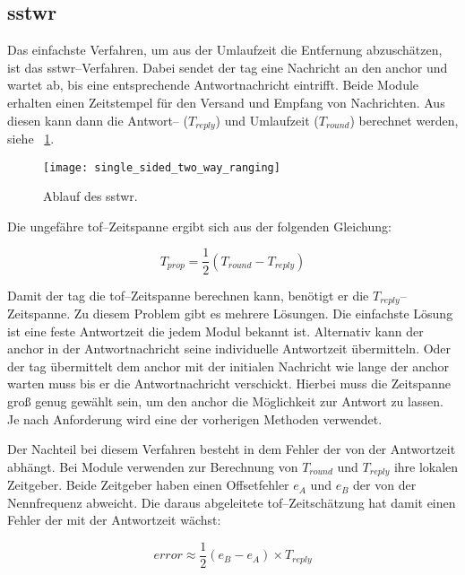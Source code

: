 \subsection{\acrlong{sstwr}}

Das einfachste Verfahren, um aus der Umlaufzeit die Entfernung abzuschätzen, ist das \Gls{sstwr}--Verfahren. Dabei sendet der \Gls{tag} eine Nachricht an den \Gls{anchor} und wartet ab, bis eine entsprechende Antwortnachricht eintrifft. Beide Module erhalten einen Zeitstempel für den Versand und Empfang von Nachrichten. Aus diesen kann dann die Antwort-- ($T_{reply}$) und Umlaufzeit ($T_{round}$) berechnet werden, siehe \figurename~\ref{fig:single_sided_two_way_ranging}. \cite{decawave2015twr, decawave2016dw1kusermanual}

\begin{figure}[ht]
	\centering
	\texttt{[image: single\_sided\_two\_way\_ranging]}
	\caption{Ablauf des \acrlong{sstwr}.}
	\label{fig:single_sided_two_way_ranging}
\end{figure}

Die ungefähre \Gls{tof}--Zeitspanne ergibt sich aus der folgenden Gleichung:

\[T_{prop}=\frac{1}{2}\left(T_{round}-T_{reply}\right)\]

Damit der \Gls{tag} die \Gls{tof}--Zeitspanne berechnen kann, benötigt er die $T_{reply}$--Zeitspanne. Zu diesem Problem gibt es mehrere Lösungen. Die einfachste Lösung ist eine feste Antwortzeit die jedem Modul bekannt ist. Alternativ kann der \Gls{anchor} in der Antwortnachricht seine individuelle Antwortzeit übermitteln. Oder der \Gls{tag} übermittelt dem \Gls{anchor} mit der initialen Nachricht wie lange der \Gls{anchor} warten muss bis er die Antwortnachricht verschickt. Hierbei muss die Zeitspanne groß genug gewählt sein, um den \Gls{anchor} die Möglichkeit zur Antwort zu lassen. Je nach Anforderung wird eine der vorherigen Methoden verwendet.

Der Nachteil bei diesem Verfahren besteht in dem Fehler der von der Antwortzeit abhängt. Bei Module verwenden zur Berechnung von $T_{round}$ und $T_{reply}$ ihre lokalen Zeitgeber. Beide Zeitgeber haben einen Offsetfehler $e_{A}$ und $e_{B}$ der von der Nennfrequenz abweicht. Die daraus abgeleitete \Gls{tof}--Zeitschätzung hat damit einen Fehler der mit der Antwortzeit wächst:

\[error\approx\frac{1}{2}\left(e_B-e_A\right)\times T_{reply}\]



